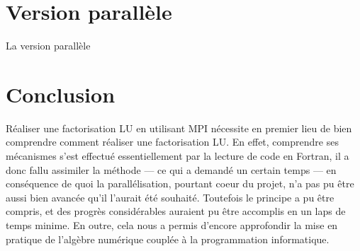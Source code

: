\documentclass[a4paper,11pt]{article}
\begin{document}
\section{Version parallèle}

La version parallèle 

\section{Conclusion}

Réaliser une factorisation LU en utilisant MPI nécessite en premier lieu de bien comprendre comment réaliser une factorisation LU. En effet, comprendre ses mécanismes s'est effectué essentiellement par la lecture de code en Fortran, il a donc fallu assimiler la méthode --- ce qui a demandé un certain temps --- en conséquence de quoi la parallélisation, pourtant coeur du projet, n'a pas pu être aussi bien avancée qu'il l'aurait été souhaité. Toutefois le principe a pu être compris, et des progrès considérables auraient pu être accomplis en un laps de temps minime. En outre, cela nous a permis d'encore approfondir la mise en pratique de l'algèbre numérique couplée à la programmation informatique.
\end{document}
